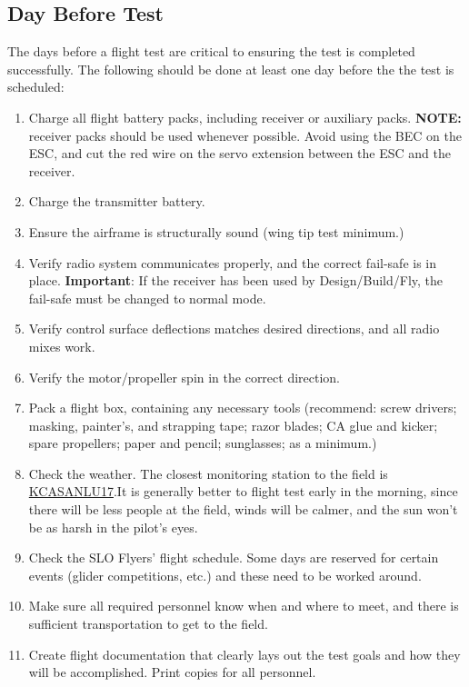 \subsection{Day Before Test}
The days before a flight test are critical to ensuring the test is completed successfully. The following should be done at least one day before the the test is scheduled:
\begin{enumerate}
\item Charge all flight battery packs, including receiver or auxiliary packs. \textbf{NOTE:} receiver packs should be used whenever possible. Avoid using the BEC on the ESC, and cut the red wire on the servo extension between the ESC and the receiver.
\item Charge the transmitter battery.
\item Ensure the airframe is structurally sound (wing tip test minimum.)
\item Verify radio system communicates properly, and the correct fail-safe is in place. \textbf{Important}: If the receiver has been used by Design/Build/Fly, the fail-safe must be changed to normal mode.
\item Verify control surface deflections matches desired directions, and all radio mixes work.
\item Verify the motor/propeller spin in the correct direction.
\item Pack a flight box, containing any necessary tools (recommend: screw drivers; masking, painter's, and strapping tape; razor blades; CA glue and kicker; spare propellers; paper and pencil; sunglasses; as a minimum.)
\item Check the weather. The closest monitoring station to the field is \href{http://www.wunderground.com/cgi-bin/findweather/getForecast?query=35.326\%2C-120.738\&sp=KCASANLU17}{KCASANLU17}.It is generally better to flight test early in the morning, since there will be less people at the field, winds will be calmer, and the sun won't be as harsh in the pilot's eyes.
\item Check the SLO Flyers' flight schedule. Some days are reserved for certain events (glider competitions, etc.) and these need to be worked around.
\item Make sure all required personnel know when and where to meet, and there is sufficient transportation to get to the field.
\item Create flight documentation that clearly lays out the test goals and how they will be accomplished. Print copies for all personnel.
\end{enumerate}

